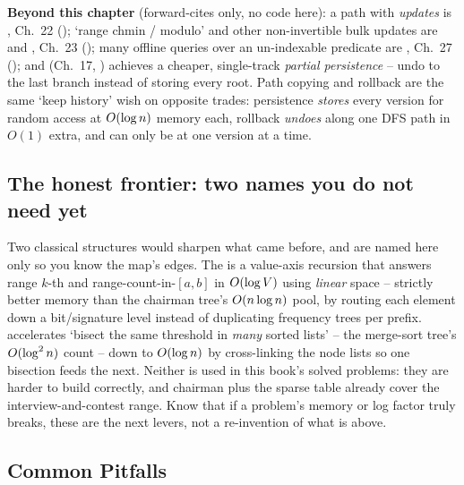 \noindent\textbf{Beyond this chapter} (forward-cites only, no code here): a path with \emph{updates} is , Ch.~22 (); `range chmin / modulo' and other non-invertible bulk updates are  and , Ch.~23 (); many offline queries over an un-indexable predicate are , Ch.~27 (); and  (Ch.~17, ) achieves a cheaper, single-track \emph{partial persistence} -- undo to the last branch instead of storing every root. Path copying and rollback are the same `keep history' wish on opposite trades: persistence \emph{stores} every version for random access at \(O(\log n)\) memory each, rollback \emph{undoes} along one DFS path in \(O(1)\) extra, and can only be at one version at a time.

\subsection{The honest frontier: two names you do not need yet}

\begin{insightbox}
Two classical structures would sharpen what came before, and are named here only so you know the map's edges. The  is a value-axis recursion that answers range \(k\)-th and range-count-in-\([a,b]\) in \(O(\log V)\) using \emph{linear} space -- strictly better memory than the chairman tree's \(O(n\log n)\) pool, by routing each element down a bit/signature level instead of duplicating frequency trees per prefix.  accelerates `bisect the same threshold in \emph{many} sorted lists' -- the merge-sort tree's \(O(\log^2 n)\) count -- down to \(O(\log n)\) by cross-linking the node lists so one bisection feeds the next. Neither is used in this book's solved problems: they are harder to build correctly, and chairman plus the sparse table already cover the interview-and-contest range. Know that if a problem's memory or log factor truly breaks, these are the next levers, not a re-invention of what is above.
\end{insightbox}

\subsection{Common Pitfalls}

